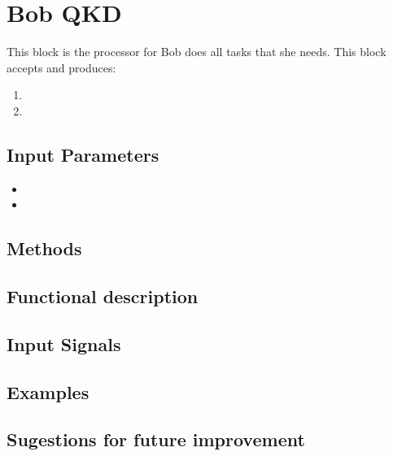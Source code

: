 \clearpage

\section{Bob QKD}

\maketitle
This block is the processor for Bob does all tasks that she needs. This block accepts and produces:

\begin{enumerate}
  \item 
  \item 
\end{enumerate}


\subsection*{Input Parameters}

	\begin{itemize}
		\item
		\item
		
	\end{itemize}

\subsection*{Methods}



\subsection*{Functional description}



\subsection*{Input Signals}


\subsection*{Examples}


\subsection*{Sugestions for future improvement} 